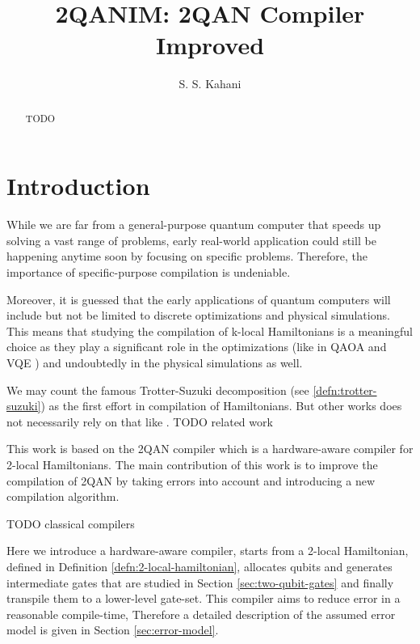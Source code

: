 \documentclass{article}
\title{2QANIM: 2QAN Compiler Improved}
\author{S. S. Kahani}
\begin{document}
  \maketitle
  \begin{abstract}
    { \color{blue} TODO }
  \end{abstract}

  \section{Introduction}
  
  While we are far from a general-purpose quantum computer 
  \cite{langione2019}
  that speeds up solving a vast range of problems, early real-world application could still be happening anytime soon by focusing on specific problems. \cite{preskill2018}
  Therefore, the importance of specific-purpose compilation is undeniable.
  
  Moreover, it is guessed that the early applications of quantum computers will include but not be limited to discrete optimizations and physical simulations.
  \cite{?} %
  This means that studying the compilation of k-local Hamiltonians is a meaningful choice as they play a significant role in the optimizations (like in QAOA \cite{farhi2014} and VQE \cite{peruzzo2014}) and undoubtedly in the physical simulations as well. 
  \cite{?} %

  We may count the famous Trotter-Suzuki decomposition (see \ref{defn:trotter-suzuki}) as the first effort in compilation of Hamiltonians.
  But other works does not necessarily rely on that like \cite{campbell2019}.
  { \color{blue} TODO related work }
  
  This work is based on the 2QAN compiler \cite{lao2021} which is a hardware-aware compiler for 2-local Hamiltonians. The main contribution of this work is to improve the compilation of 2QAN by taking errors into account and introducing a new compilation algorithm. 

  { \color{blue} TODO classical compilers }

  Here we introduce a hardware-aware compiler, starts from a 2-local Hamiltonian, defined in Definition \ref{defn:2-local-hamiltonian}, allocates qubits and generates intermediate gates that are studied in Section \ref{sec:two-qubit-gates} and finally transpile them to a lower-level gate-set. This compiler aims to reduce error in a reasonable compile-time, Therefore a detailed description of the assumed error model is given in Section \ref{sec:error-model}.
\end{document}
